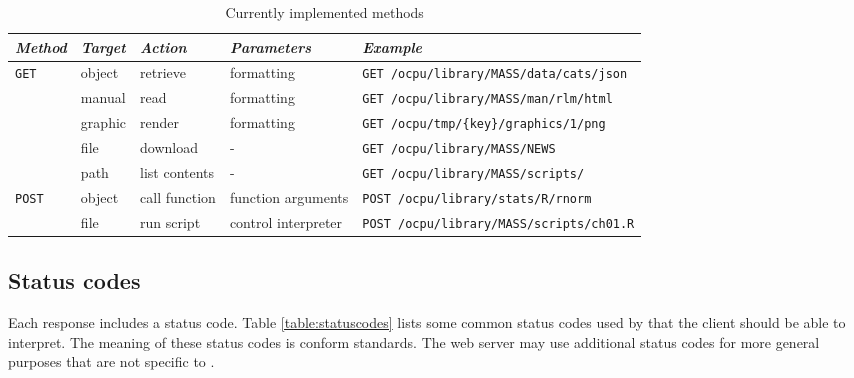 \begin{sidewaystable}[ht]
\mytablesize
\centering
\begin{tabular}{@{}lllll@{}}
\toprule
\emph{Method} & \emph{Target} & \emph{Action}  & \emph{Parameters}     & \emph{Example}                                      \\ \midrule
\texttt{GET}    & object  & retrieve      &  formatting     & \texttt{GET /ocpu/library/MASS/data/cats/json}            \\
                & manual  & read          &  formatting     & \texttt{GET /ocpu/library/MASS/man/rlm/html}            \\  
                & graphic & render        &  formatting    & \texttt{GET /ocpu/tmp/\{key\}/graphics/1/png}            \\   
                & file    & download      & -                     & \texttt{GET /ocpu/library/MASS/NEWS}                         \\
                & path    & list contents & -                     & \texttt{GET /ocpu/library/MASS/scripts/}                     \\ \midrule
\texttt{POST}   & object  & call function & function arguments    & \texttt{POST /ocpu/library/stats/R/rnorm}                    \\
                & file    & run script    & control interpreter   & \texttt{POST /ocpu/library/MASS/scripts/ch01.R}              \\ \bottomrule
\end{tabular}
\caption{Currently implemented \HTTP methods}
\label{table:methods}
\end{sidewaystable}

\subsection{Status codes}

Each \HTTP response includes a status code. Table \ref{table:statuscodes} lists some common \HTTP status codes used by \OpenCPU that the client should be able to interpret. The meaning of these status codes is conform \HTTP standards. The web server may use additional status codes for more general purposes that are not specific to \OpenCPU.

